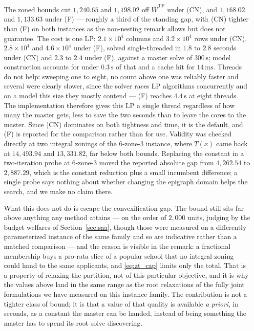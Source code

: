 \documentclass{article}
\begin{document}
The zoned bounds cut $1{,}240.65$ and $1{,}198.02$ off $\overline{W}^{\mathrm{TP}}$ under (CN), and $1{,}168.02$ and $1{,}133.63$ under (F) --- roughly a third of the standing gap, with (CN) tighter than (F) on both instances as the non-nesting remark allows but does not guarantee. The cost is one LP: $2.1 \times 10^4$ columns and $3.2 \times 10^4$ rows under (CN), $2.8 \times 10^4$ and $4.6 \times 10^4$ under (F), solved single-threaded in $1.8$ to $2.8$ seconds under (CN) and $2.3$ to $2.4$ under (F), against a master solve of $300\,\mathrm{s}$; model construction accounts for under $0.3\,\mathrm{s}$ of that and a cache hit for $14\,\mathrm{ms}$. Threads do not help: sweeping one to eight, no count above one was reliably faster and several were clearly slower, since the solver races LP algorithms concurrently and on a model this size they mostly contend --- (F) reaches $4.4\,\mathrm{s}$ at eight threads. The implementation therefore gives this LP a single thread regardless of how many the master gets, less to save the two seconds than to leave the cores to the master. Since (CN) dominates on both tightness and time, it is the default, and (F) is reported for the comparison rather than for use. Validity was checked directly at two integral zonings of the 6-zone-3 instance, where $T(x)$ came back at $14{,}493.94$ and $13{,}331.82$, far below both bounds. Replacing the constant in a two-iteration probe at 6-zone-3 moved the reported absolute gap from $4{,}262.54$ to $2{,}887.29$, which is the constant reduction plus a small incumbent difference; a single probe says nothing about whether changing the epigraph domain helps the search, and we make no claim there.

What this does not do is escape the convexification gap. The bound still sits far above anything any method attains --- on the order of $2{,}000$ units, judging by the budget welfares of Section~\ref{sec:saa}, though those were measured on a differently parameterized instance of the same family and so are indicative rather than a matched comparison --- and the reason is visible in the remark: a fractional membership buys a pro-rata slice of a popular school that no integral zoning could hand to the same applicants, and \eqref{eq:zt_cap} limits only the total. That is a property of relaxing the partition, not of this particular objective, and it is why the values above land in the same range as the root relaxations of the fully joint formulations we have measured on this instance family. The contribution is not a tighter class of bound; it is that a value of that quality is available \emph{a priori}, in seconds, as a constant the master can be handed, instead of being something the master has to spend its root solve discovering.
\end{document}
